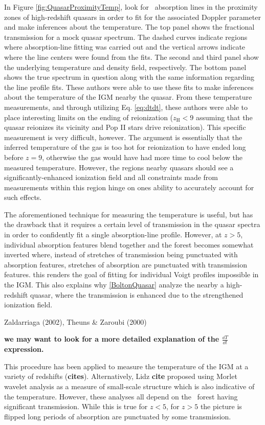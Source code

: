 In Figure \ref{fig:QuasarProximityTemp}, \cite{BoltonQuasar} look for \lya\ absorption lines in the proximity zones of high-redshift quasars in order to fit for the associated Doppler parameter and make inferences about the temperature. The top panel shows the fractional transmission for a mock quasar spectrum. The dashed curves indicate regions where absorption-line fitting was carried out and the vertical arrows indicate where the line centers were found from the fits. The second and third panel show the underlying temperature and density field, respectively. The bottom panel shows the true spectrum in question along with the same information regarding the line profile fits. These authors were able to use these fits to make inferences about the temperature of the IGM nearby the quasar. From these temperature measurements, and through utilizing Eq. \ref{eq:dtdt}, these authors were able to place interesting limits on the ending of reionization ($z_{\text{H}} <  9$ assuming that the quasar reionizes its vicinity and Pop II stars drive reionization). This specific measurement is very difficult, however. The argument is essentially that the inferred temperature of the gas is too hot for reionization to have ended long before $z = 9$, otherwise the gas would have had more time to cool below the measured temperature. However, the regions nearby quasars should see a significantly-enhanced ionization field and all constraints made from measurements within this region hinge on ones ability to accurately account for such effects. 


The aforementioned technique for measuring the temperature is useful, but has the drawback that it requires a certain level of transmission in the quasar spectra in order to confidently fit a single absorption-line profile. However, at $z > 5$, individual absorption features blend together and the forest becomes somewhat inverted where, instead of stretches of transmission being punctuated with absorption features, stretches of absorption are punctuated with transmission features. this renders the goal of fitting for individual Voigt profiles impossible in the IGM. This also explains why \ref{BoltonQuasar} analyze the nearby a high-redshift quasar, where the transmission is enhanced due to the strengthened ionization field. 

Zaldarriaga (2002), Theuns \& Zaroubi (2000)

{\bf we may want to look for a more detailed explanation of the $\frac{\dd T}{\dd t}$ expression. }

This procedure has been applied to measure the temperature of the IGM at a variety of redshifts ({\bf cites}). Alternatively, Lidz {\bf cite} proposed using Morlet wavelet analysis as a measure of small-scale structure which is also indicative of the temperature. However, these analyses all depend on the \lya\ forest having significant transmission. While this is true for $z < 5$, for $z > 5$ the picture is flipped long periods of absorption are punctuated by some transmission. 

